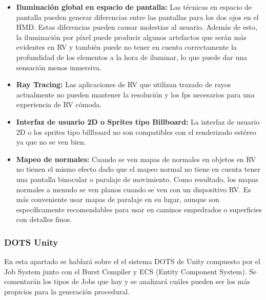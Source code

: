             \begin{itemize}
                \item \textbf{Iluminación global en espacio de pantalla:} Las técnicas en espacio de pantalla pueden generar diferencias entre las pantallas para los dos ojos en el HMD. Estas diferencias pueden causar molestias al usuario. Además de esto, la iluminación por píxel puede producir algunos artefactos que serán más evidentes en RV y también puede no tener en cuenta correctamente la profundidad de los elementos a la hora de iluminar, lo que puede dar una sensación menos inmersiva.
                \item \textbf{Ray Tracing:} Las aplicaciones de RV que utilizan trazado de rayos actualmente no pueden mantener la resolución y los fps necesarios para una experiencia de RV cómoda.
                \item \textbf{Interfaz de usuario 2D o Sprites tipo Billboard:} La interfaz de usuario 2D o los sprites tipo billboard no son compatibles con el renderizado estéreo ya que no se ven bien.
                \item \textbf{Mapeo de normales:} Cuando se ven mapas de normales en objetos en RV no tienen el mismo efecto dado que el mapeo normal no tiene en cuenta tener una pantalla binocular o paralaje de movimiento. Como resultado, los mapas normales a menudo se ven planos cuando se ven con un dispositivo RV. Es más conveniente usar mapas de paralaje en su lugar, aunque son específicamente recomendables para usar en caminos empedrados o superficies con detalles finos.
            \end{itemize}

            
            \subsubsection{DOTS Unity}
            En esta apartado se hablará sobre el el sistema DOTS de Unity compuesto por el Job System junto con el Burst Compiler y ECS (Entity Component System). Se comentarán los tipos de Jobs que hay y se analizará cuáles pueden ser los más propicios para la generación procedural. 

